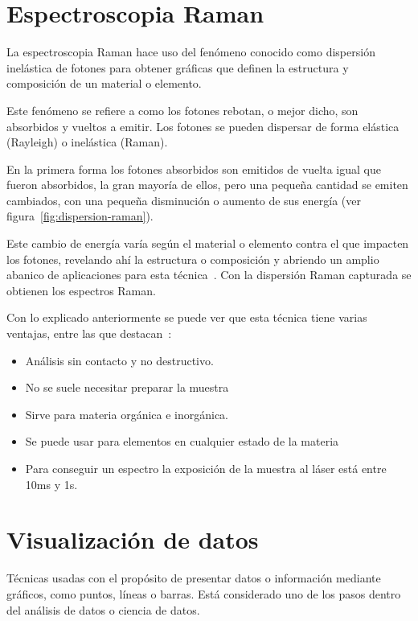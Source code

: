 
\section{Espectroscopia Raman}\label{def:raman}
La espectroscopia Raman hace uso del fenómeno conocido como dispersión
inelástica de fotones para obtener gráficas que definen la estructura y
composición de un material o elemento.

Este fenómeno se refiere a como los fotones rebotan, o mejor dicho, son
absorbidos y vueltos a emitir. Los fotones se pueden
dispersar de forma elástica (Rayleigh) o inelástica (Raman).

En la primera forma los fotones absorbidos son emitidos de vuelta igual que
fueron absorbidos, la gran mayoría de ellos, pero una pequeña cantidad se emiten
cambiados, con una pequeña disminución o aumento de sus energía (ver
figura~\ref{fig:dispersion-raman}).

Este cambio de energía varía según el material o elemento contra el que impacten
los fotones, revelando ahí la estructura o composición y abriendo un amplio
abanico de aplicaciones para esta
técnica~\cite{what-is-raman,wiki:raman-scatter}. Con la dispersión Raman
capturada se obtienen los espectros Raman.


Con lo explicado anteriormente se puede ver que esta técnica tiene varias
ventajas, entre las que destacan~\cite{what-is-raman}:
\begin{itemize}
	\tightlist
	\item Análisis sin contacto y no destructivo.
	\item No se suele necesitar preparar la muestra
	\item Sirve para materia orgánica e inorgánica.
	\item Se puede usar para elementos en cualquier estado de la materia
	\item Para conseguir un espectro la exposición de la muestra al láser está
	entre 10ms y 1s.
\end{itemize}

\section{Visualización de datos}

Técnicas usadas con el propósito de presentar datos o información mediante
gráficos, como puntos, líneas o barras. Está considerado uno de los pasos dentro
del análisis de datos o ciencia de datos\cite{wiki:dataviz}.


